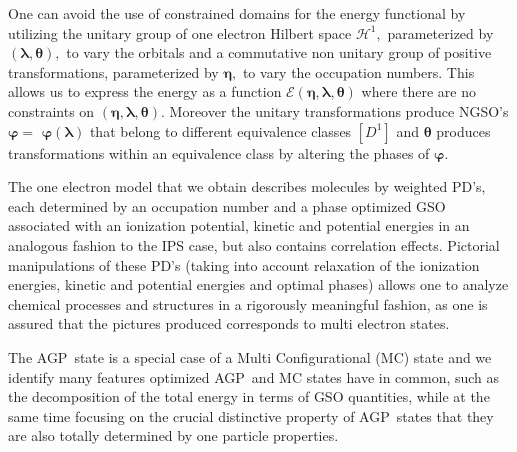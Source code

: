 \documentclass[aps,preprint]{revtex4}%
\begin{document}
One can avoid the use of constrained domains for the energy functional by
utilizing the unitary group of one electron Hilbert space $\mathcal{H}^{1},$
parameterized by $\left(  \mathbf{\lambda},\mathbf{\theta}\right)  ,$ to vary
the orbitals and a commutative non unitary group of positive transformations,
parameterized by $\mathbf{\eta},$ to vary the occupation numbers. This allows
us to express the energy as a function $\mathcal{E}\left(  \mathbf{\eta
},\mathbf{\lambda},\mathbf{\theta}\right)  $ where there are no constraints on
$\left(  \mathbf{\eta},\mathbf{\lambda},\mathbf{\theta}\right)  .$ Moreover
the unitary transformations produce NGSO's $\mathbf{\varphi=}$
$\mathbf{\varphi}\left(  \mathbf{\lambda}\right)  $ that belong to different
equivalence classes $\left[  D^{1}\right]  $ and $\mathbf{\theta}$ produces
transformations within an equivalence class by altering the phases of
$\mathbf{\varphi.}$

The one electron model that we obtain describes molecules by weighted PD's,
each determined by an occupation number and a phase optimized GSO associated
with an ionization potential, kinetic and potential energies in an analogous
fashion to the IPS case, but also contains correlation effects. Pictorial
manipulations of these PD's (taking into account relaxation of the ionization
energies, kinetic and potential energies and optimal phases) allows one to
analyze chemical processes and structures in a rigorously meaningful fashion,
as one is assured that the pictures produced corresponds to multi electron states.

The AGP\ state is a special case of a Multi Configurational (MC) state and we
identify many features optimized AGP\ and MC states have in common, such as
the decomposition of the total energy in terms of GSO quantities, while at the
same time focusing on the crucial distinctive property of AGP\ states that
they are also totally determined by one particle properties.
\end{document}

